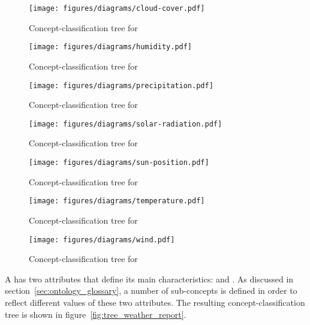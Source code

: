 \begin{figure}
  \centering
  \texttt{[image: figures/diagrams/cloud-cover.pdf]}
  \caption{Concept-classification tree for }
  \label{fig:tree_cloud_cover}
\end{figure}

\begin{figure}
  \centering
  \texttt{[image: figures/diagrams/humidity.pdf]}
  \caption{Concept-classification tree for }
  \label{fig:tree_humidity}
\end{figure}

\begin{figure}
  \centering
  \texttt{[image: figures/diagrams/precipitation.pdf]}
  \caption{Concept-classification tree for }
  \label{fig:tree_precipitation}
\end{figure}

\begin{figure}
  \centering
  \texttt{[image: figures/diagrams/solar-radiation.pdf]}
  \caption{Concept-classification tree for }
  \label{fig:tree_solar_radiation}
\end{figure}

\begin{figure}
  \centering
  \texttt{[image: figures/diagrams/sun-position.pdf]}
  \caption{Concept-classification tree for }
  \label{fig:tree_sun_position}
\end{figure}

\begin{figure}
  \centering
  \texttt{[image: figures/diagrams/temperature.pdf]}
  \caption{Concept-classification tree for }
  \label{fig:tree_temperature}
\end{figure}

\begin{figure}
  \centering
  \texttt{[image: figures/diagrams/wind.pdf]}
  \caption{Concept-classification tree for }
  \label{fig:tree_wind}
\end{figure}

A  has two attributes that define its main characteristics:  and . As discussed in section~\ref{sec:ontology_glossary}, a number of sub-concepts is defined in order to reflect different values of these two attributes. The resulting concept-classification tree is shown in figure~\ref{fig:tree_weather_report}.

